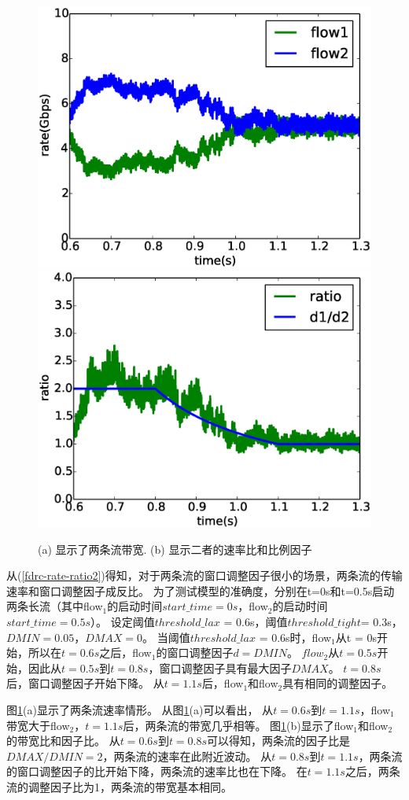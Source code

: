\begin{figure}[h]
\centering
{}
 {\includegraphics[width=0.48\columnwidth]{figures/FDRC/model/rate.eps}}
{\includegraphics[width=0.48\columnwidth]{figures/FDRC/model/ratio.eps}}
\caption{(a) 显示了两条流带宽. (b) 显示二者的速率比和比例因子}
\label{fdrc-model-rate-ratio}
\end{figure}


从(\ref{fdrc-rate-ratio2})得知，对于两条流的窗口调整因子很小的场景，两条流的传输速率和窗口调整因子成反比。
为了测试模型的准确度，分别在t=0s和t=0.5s启动两条长流（其中flow$_1$的启动时间$start\_time = 0s$，flow$_2$的启动时间$start\_time = 0.5s$）。
设定阈值$threshold\_lax$ = 0.6s，阈值$threshold\_tight$= 0.3s，$DMIN = 0.05$，$DMAX = 0$。
当阈值$threshold\_lax$ = 0.6s时，flow$_1$从t = 0s开始，所以在$t = 0.6s$之后，flow$_1$的窗口调整因子$d= DMIN$。
$flow_2$从$t = 0.5s$开始，因此从$t = 0.5s$到$t = 0.8s$，窗口调整因子具有最大因子$DMAX$。
$t = 0.8s$后，窗口调整因子开始下降。
从$t = 1.1s$后，flow$_1$和flow$_2$具有相同的调整因子。

图\ref{fdrc-model-rate-ratio}(a)显示了两条流速率情形。
从图\ref{fdrc-model-rate-ratio}(a)可以看出，
从$t = 0.6s$到$t = 1.1s$，flow$_1$带宽大于flow$_2$，$t = 1.1s$后，两条流的带宽几乎相等。
图\ref{fdrc-model-rate-ratio}(b)显示了flow$_1$和flow$_2$的带宽比和因子比。
从$t = 0.6s$到$t = 0.8s$可以得知，两条流的因子比是$DMAX/DMIN = 2$，两条流的速率在此附近波动。
从$t = 0.8s$到$t = 1.1s$，两条流的窗口调整因子的比开始下降，两条流的速率比也在下降。
在$t = 1.1s$之后，两条流的调整因子比为1，两条流的带宽基本相同。

